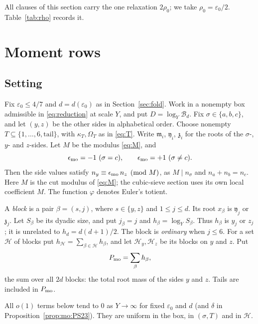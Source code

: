 \documentclass{amsart}
\theoremstyle{definition}
\theoremstyle{plain}
\numberwithin{equation}{section}
\numberwithin{table}{section}
\begin{document}
All clauses of this section carry the one relaxation $2\rho_0$; we take
$\rho_0=\varepsilon_0/2$. Table~\ref{tab:rho} records it.


\section{Moment rows}\label{sec:moment}

\subsection{Setting}\label{sec:mo:setting}

Fix $\varepsilon_0\le4/7$ and $d=d(\varepsilon_0)$ as in
Section~\ref{sec:fold}. Work in a nonempty box
admissible in \eqref{eq:reduction} at scale $Y$, and put
$D=\log_Y\mathcal B_d$. Fix $\sigma\in\{a,b,c\}$, and let $(y,z)$ be the
other sides in alphabetical order. Choose nonempty
$T\subseteq\{1,\dots,6,\mathrm{tail}\}$, with $\kappa_T,\Omega_T$ as in
\eqref{eq:T}. Write $\mathfrak m_i$, $\mathfrak y_i$, $\mathfrak z_i$ for the
roots of the $\sigma$-, $y$- and $z$-sides. Let $M$ be the modulus \eqref{eq:M}, and
\[
 \epsilon_{\rm mo}=-1\ (\sigma=c),\qquad \epsilon_{\rm mo}=+1\ (\sigma\ne c).
\]
Then the side values satisfy $n_y\equiv\epsilon_{\rm mo}\,n_z\pmod M$, as
$M\mid n_\sigma$ and $n_a+n_b=n_c$.
Here $M$ is the cut modulus of \eqref{eq:M}; the cubic-sieve section uses its
own local coefficient $M$. The function $\varphi$ denotes Euler's totient.

A \emph{block} is a pair $\beta=(s,j)$, where $s\in\{y,z\}$ and $1\le j\le d$.
Its root $x_\beta$ is $\mathfrak y_j$ or $\mathfrak z_j$. Let $S_\beta$ be its dyadic size, and
put $j_\beta=j$ and $h_\beta=\log_YS_\beta$. Thus $h_\beta$ is $y_j$ or $z_j$;
it is unrelated to $h_d=d(d+1)/2$.
The block is \emph{ordinary} when $j\le6$. For a set $\mathcal H$ of blocks put
$h_{\mathcal H}=\sum_{\beta\in\mathcal H}h_\beta$, and let
$\mathcal H_y,\mathcal H_z$ be its blocks on $y$ and $z$. Put
\begin{equation}\label{eq:mo:P}
 P_{\rm mo}=\sum_{\beta}h_\beta,
\end{equation}
the sum over all $2d$ blocks: the total root mass of the sides $y$ and $z$.
Tails are included in $P_{\rm mo}$.

All $o(1)$ terms below tend to $0$ as $Y\to\infty$ for fixed $\varepsilon_0$
and $d$ (and $\delta$ in Proposition~\ref{prop:mo:PS23}). They are uniform in
the box, in $(\sigma,T)$ and in $\mathcal H$.
\end{document}
